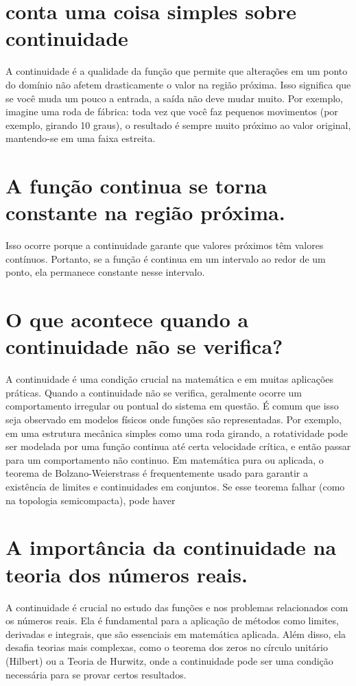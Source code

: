 \documentclass[11pt,a4paper]{article}
\begin{document}
\section{conta uma coisa simples sobre continuidade}
A continuidade é a qualidade da função que permite que alterações em um ponto do domínio não afetem drasticamente o valor na região próxima. Isso significa que se você muda um pouco a entrada, a saída não deve mudar muito. Por exemplo, imagine uma roda de fábrica: toda vez que você faz pequenos movimentos (por exemplo, girando 10 graus), o resultado é sempre muito próximo ao valor original, mantendo-se em uma faixa estreita.

\section{A função continua se torna constante na região próxima.}
Isso ocorre porque a continuidade garante que valores próximos têm valores contínuos. Portanto, se a função é continua em um intervalo ao redor de um ponto, ela permanece constante nesse intervalo.

\section{O que acontece quando a continuidade não se verifica?}
A continuidade é uma condição crucial na matemática e em muitas aplicações práticas. Quando a continuidade não se verifica, geralmente ocorre um comportamento irregular ou pontual do sistema em questão. É comum que isso seja observado em modelos físicos onde funções são representadas. Por exemplo, em uma estrutura mecânica simples como uma roda girando, a rotatividade pode ser modelada por uma função continua até certa velocidade crítica, e então passar para um comportamento não continuo. Em matemática pura ou aplicada, o teorema de Bolzano-Weierstrass é frequentemente usado para garantir a existência de limites e continuidades em conjuntos. Se esse teorema falhar (como na topologia semicompacta), pode haver

\section{A importância da continuidade na teoria dos números reais.}
A continuidade é crucial no estudo das funções e nos problemas relacionados com os números reais. Ela é fundamental para a aplicação de métodos como limites, derivadas e integrais, que são essenciais em matemática aplicada. Além disso, ela desafia teorias mais complexas, como o teorema dos zeros no círculo unitário (Hilbert) ou a Teoria de Hurwitz, onde a continuidade pode ser uma condição necessária para se provar certos resultados.
\end{document}
